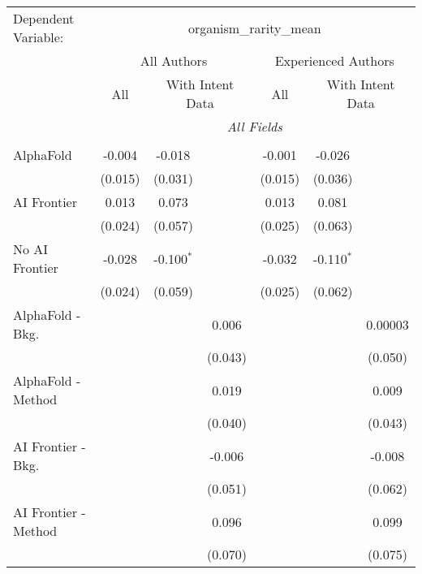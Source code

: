 \begingroup
\centering
\begin{tabular}{lcccccc}
   \tabularnewline \midrule \midrule
   Dependent Variable: & \multicolumn{6}{c}{organism\_rarity\_mean}\\
 & \multicolumn{3}{c}{All Authors} & \multicolumn{3}{c}{Experienced Authors} \\
\cmidrule(lr){2-4} \cmidrule(lr){5-7}
 & \multicolumn{1}{c}{All} & \multicolumn{2}{c}{With Intent Data} & \multicolumn{1}{c}{All} & \multicolumn{2}{c}{With Intent Data} \\
\cmidrule(lr){2-2} \cmidrule(lr){3-4} \cmidrule(lr){5-5} \cmidrule(lr){6-7}
 & \multicolumn{6}{c}{\textit{All Fields}} \\ \\
   AlphaFold               & -0.004  & -0.018       &         & -0.001  & -0.026       &   \\   
                           & (0.015) & (0.031)      &         & (0.015) & (0.036)      &   \\   
   AI Frontier             & 0.013   & 0.073        &         & 0.013   & 0.081        &   \\   
                           & (0.024) & (0.057)      &         & (0.025) & (0.063)      &   \\   
   No AI Frontier          & -0.028  & -0.100$^{*}$ &         & -0.032  & -0.110$^{*}$ &   \\   
                           & (0.024) & (0.059)      &         & (0.025) & (0.062)      &   \\   
   AlphaFold - Bkg.        &         &              & 0.006   &         &              & 0.00003\\   
                           &         &              & (0.043) &         &              & (0.050)\\   
   AlphaFold - Method      &         &              & 0.019   &         &              & 0.009\\   
                           &         &              & (0.040) &         &              & (0.043)\\   
   AI Frontier - Bkg.      &         &              & -0.006  &         &              & -0.008\\   
                           &         &              & (0.051) &         &              & (0.062)\\   
   AI Frontier - Method    &         &              & 0.096   &         &              & 0.099\\   
                           &         &              & (0.070) &         &              & (0.075)\\   

\end{tabular}
